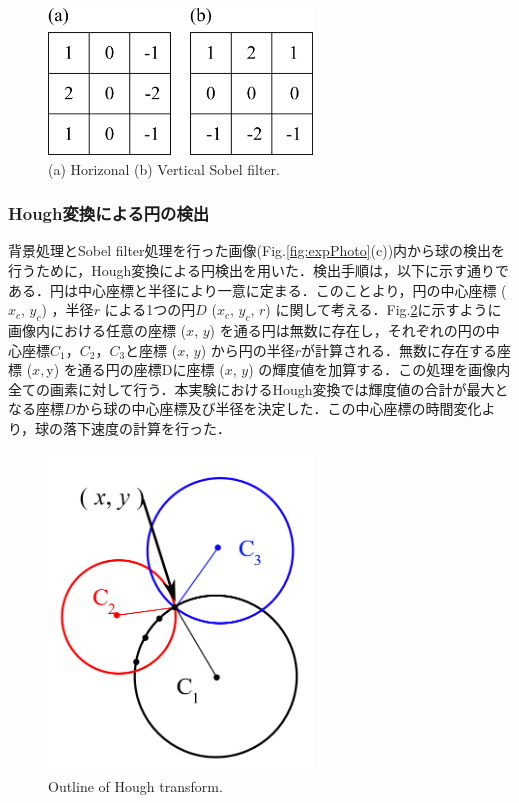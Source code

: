 \begin{figure}[h]
    \centering
    \includegraphics[width=7.0cm,clip]{2-Methods/sobel-filter.png}
    \caption{(a) Horizonal (b) Vertical Sobel filter.}
    \label{fig:sobel}
\end{figure}

\newpage

\subsubsection{Hough変換による円の検出}
背景処理とSobel filter処理を行った画像(Fig.\ref{fig:expPhoto}(c))内から球の検出を行うために，Hough変換による円検出を用いた．検出手順は，以下に示す通りである．円は中心座標と半径により一意に定まる．このことより，円の中心座標 ($x_c$, $y_c$) ，半径$r$ による1つの円$D$ ($x_c$, $y_c$, $r$) に関して考える．Fig.\ref{fig:hough}に示すように画像内における任意の座標 ($x$, $y$) を通る円は無数に存在し，それぞれの円の中心座標$C_1$，$C_2$，$C_3$と座標 ($x$, $y$) から円の半径$r$が計算される．無数に存在する座標 ($x, $y) を通る円の座標Dに座標 ($x$, $y$) の輝度値を加算する．この処理を画像内全ての画素に対して行う．本実験におけるHough変換では輝度値の合計が最大となる座標$D$から球の中心座標及び半径を決定した．この中心座標の時間変化より，球の落下速度の計算を行った．

\begin{figure}[h]
    \centering
    \includegraphics[width=7.0cm,clip]{2-Methods/hough.PNG}
    \caption{Outline of Hough transform.}
    \label{fig:hough}
\end{figure}
